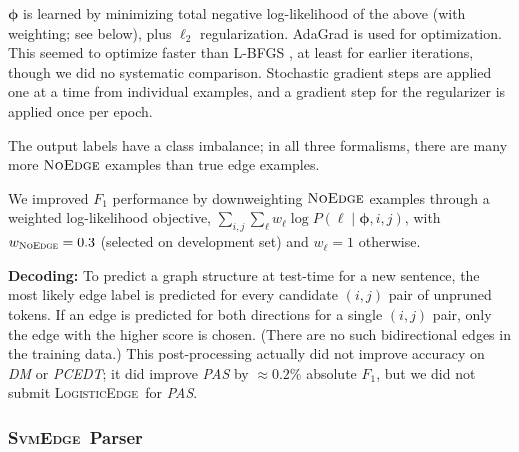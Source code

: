 \documentclass[11pt]{article}
\newcommand{\bocomment}[1]{\textcolor{Bittersweet}{[#1 -BTO]}}
\newcommand{\sam}[1]{\textcolor{blue}{[#1 -SMT]}}
\renewcommand{\bocomment}[1]{}
\renewcommand{\sam}[1]{}
\newcommand{\codenote}[1]{}
\newcommand{\logitedge}{\textsc{LogisticEdge}}
\newcommand{\svmedge}{\textsc{SvmEdge}}
\newcommand{\noedge}{\textsc{NoEdge}}
\begin{document}
\noindent
$\bm\phi$ is learned by minimizing total negative log-likelihood of the above
(with weighting; see below), plus $\ell_2$ regularization.
AdaGrad \cite{duchi_adaptive_2011} is used for optimization.
This seemed to optimize faster than L-BFGS \cite{Liu1989LBFGS}, at least for earlier
iterations, though we did no systematic comparison. Stochastic gradient steps
are applied one at a time from individual examples, and a gradient step for the
regularizer is applied once per epoch.

The output labels have a class imbalance; in all three formalisms, there
are many more $\noedge$ examples than true edge examples.
\sam{If we get these numbers, it would be nicer to quantify, and say something
like ``In the FFF formalism, the training set (\S\ref{s:evaluation}) contains NNN
candidate edges (pairs of tokens with length between 1 and 10 inclusive), and NNN actual (non-null) edges.''}
We improved $F_1$ performance by
downweighting $\noedge$ examples through a weighted log-likelihood objective,
$\sum_{i,j} \sum_\ell w_\ell \log P(\ell \mid \bm\phi, i, j)$, 
with $w_{\noedge}=0.3$ (selected on development set)
and $w_{\ell} = 1$ otherwise.




\textbf{Decoding:} \codenote{MyGraph::decodeEdgeProbsToGraph()}
To predict a graph structure at test-time for a new sentence,
the most likely edge label is predicted for every candidate $(i, j)$ pair of
unpruned tokens.
If an edge is predicted for both directions for a single $(i,j)$
pair, only the edge with the higher score is chosen.
(There are no such bidirectional edges in the training data.)
This post-processing actually did not improve accuracy on \emph{DM} or \emph{PCEDT};
it did improve \emph{PAS} by $\approx0.2\%$ absolute $F_1$, but we did not submit \logitedge\ for \emph{PAS}.
\codenote{\url{https://github.com/Noahs-ARK/semeval-2014/pull/21}}


\subsubsection{\svmedge~Parser}
\label{s:graphparser}
\end{document}
